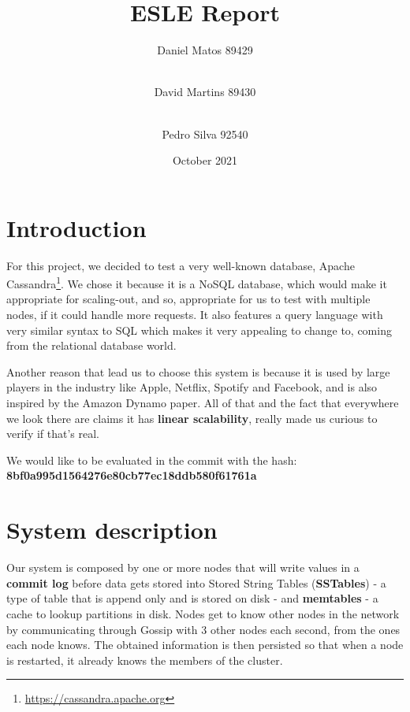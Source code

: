 \documentclass[runningheads]{llncs}
\author{
    Daniel Matos \email{daniel.m.matos@tecnico.ulisboa.pt} 89429 \and \\
    David Martins \email{david.d.martins@tecnico.ulisboa.pt } 89430 \and \\
    Pedro Silva \email{pedro.m.e.silva@tecnico.ulisboa.pt} 92540
}
\institute{Group 4}
\title{ESLE Report}
\date{October 2021}
\begin{document}
\maketitle

\section{Introduction}

For this project, we decided to test a very well-known database, Apache Cassandra\footnote{\url{https://cassandra.apache.org}}.
We chose it because it is a NoSQL database, which would make it appropriate for scaling-out, and so, appropriate for us to test with multiple nodes, if it could handle more requests. It also features a query language with very similar syntax to SQL which makes it very appealing to change to, coming from the relational database world.\par
Another reason that lead us to choose this system is because it is used by large players in the industry like Apple\cite{apple}, Netflix\cite{netflix}, Spotify\cite{spotify} and Facebook\cite{instagram}, and is also inspired by the Amazon Dynamo paper\cite{dynamo}. All of that and the fact that everywhere we look there are claims it has \textbf{linear scalability}, really made us curious to verify if that's real.\par
We would like to be evaluated in the commit with the hash: \\
\textbf{8bf0a995d1564276e80cb77ec18ddb580f61761a} %

\section{System description}


Our system is composed by one or more nodes that will write values in a \textbf{commit log} before data gets stored into Stored String Tables (\textbf{SSTables})\cite{scylla} - a type of table that is append only and is stored on disk - and \textbf{memtables} - a cache to lookup partitions in disk. Nodes get to know other nodes in the network by communicating through Gossip with 3 other nodes each second, from the ones each node knows. The obtained information is then persisted so that when a node is restarted, it already knows the members of the cluster.\par
\end{document}
